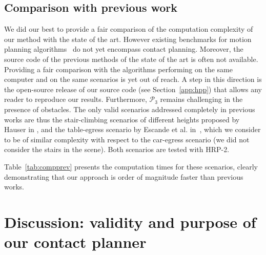 \documentclass[journal]{IEEEtran}
\providecommand{\DIFaddtex}[1]{#1} %
\providecommand{\DIFdeltex}[1]{} %
\providecommand{\DIFaddbegin}{\protect\color{blue}} %
\providecommand{\DIFaddend}{\protect\color{black}} %
\providecommand{\DIFdelbegin}{\protect\cbdelete} %
\providecommand{\DIFdelend}{} %
\providecommand{\DIFadd}[1]{\texorpdfstring{\DIFaddtex{#1}}{#1}} %
\providecommand{\DIFdel}[1]{\texorpdfstring{\DIFdeltex{#1}}{}} %
\begin{document}
\DIFdelend \subsection{Comparison with previous work} \label{sec:compa}
We did our best to provide a fair comparison of the computation complexity of our method with the state of the art. 
However existing benchmarks for motion planning algorithms~\cite{moll2014extensible} do not yet encompass contact planning.
Moreover, the source code of the previous methods of the state of the art is often not available.
Providing a fair comparison with the algorithms performing on the same computer and on the same scenarios is yet out of reach.
A step in this direction is the open-source release of our source code (see \DIFdelbegin \DIFdel{Appendix}\DIFdelend \DIFaddbegin \DIFadd{Section}\DIFaddend ~\ref{app:hpp}) that allows any reader to reproduce our results.
Furthermore, $\mathcal{P}_3$ remains challenging in the presence of obstacles. The only valid scenarios addressed completely in previous works are thus the stair-climbing scenarios of different heights proposed by Hauser in \cite{Hauser06usingmotion}, and the table-egress scenario by Escande et al. in~\cite{DBLP:conf/iser/EscandeKMG08}, which we consider to be of similar complexity with respect to the car-egress scenario (we did not consider the stairs in the scene). Both scenarios are tested with HRP-2.

Table~\ref{tab:compprev} presents the computation times for these scenarios, clearly demonstrating that our approach is order of magnitude faster than previous works.




 \section{Discussion: validity and \DIFdelbegin \DIFdel{interest }\DIFdelend \DIFaddbegin \DIFadd{purpose }\DIFaddend of our contact planner} 
\label{sec:discussion}
\end{document}
